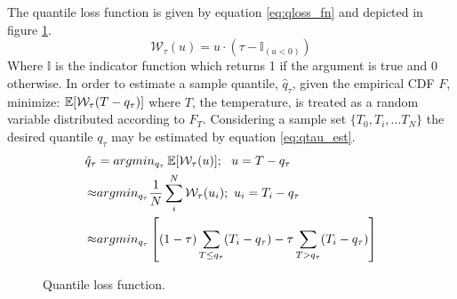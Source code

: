 The quantile loss function is given by equation \ref{eq:qloss_fn} and depicted in figure \ref{fig:qloss}.
\begin{equation}
\mathcal W_\tau( u) =  u \cdot (\tau - \mathbb{I}_{( u < 0)})
\label{eq:qloss_fn}
\end{equation}
Where $\mathbb{I}$ is the indicator function which returns 1 if the argument is true and 0 otherwise.
In order to estimate a sample quantile, $\hat q_\tau$, given the empirical CDF $F$, minimize: $\operatorname*{\mathbb{E}}[\mathcal W_\tau(T - q_\tau)]$ where $T$, the temperature, is treated as a random variable distributed according to $F_T$.  Considering a sample set $\{T_0, T_i, \dots T_N \}$ the desired quantile $q_\tau$ may be estimated by equation \ref{eq:qtau_est}.
\begin{equation}
            \left.\begin{aligned}
            \hat q_{\tau} &= argmin_{q_\tau} \operatorname*{\mathbb{E}}[\mathcal W_\tau(u)];\ \  u = T - q_\tau  \\
            \approx & argmin_{q_\tau}  \frac{1}{N} \sum_i^N \mathcal W_\tau(u_i); \ u_i = T_i - q_\tau \\
            \approx & argmin_{q_\tau} \left[ (1-\tau) \sum_{T \leq q_\tau}( T_i - q_\tau ) - \tau \sum_{T > q_\tau} (T_i - q_\tau) \right]
            \end{aligned}\right.
            \label{eq:qtau_est}
\end{equation}


\begin{figure}[H]
	\centering
    \caption[Quantile loss function.]{Quantile loss function.}
\label{fig:qloss}
\end{figure}

